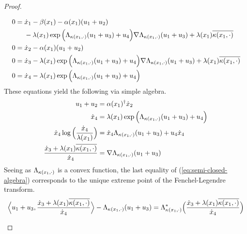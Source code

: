 \begin{proof}
\begin{enumerate}
\begin{align*}
        0 &= \begin{aligned}[t]
          &\dot{x}_1 - \beta(x_1) - \alpha(x_1) (u_1 + u_2) \\
          &- \lambda(x_1) \exp\Big( \Lambda_{\kappa(x_1,\cdot)}(u_1+u_3) + u_4\Big) \nabla\Lambda_{\kappa(x_1,\cdot)}(u_1+u_3) + \lambda(x_1) \overline{\kappa(x_1, \cdot)}
        \end{aligned} \\
        0 &= \dot{x}_2 - \alpha(x_1) ( u_1 + u_2 ) \\
        0 &= \dot{x}_3 - \lambda(x_1) \exp\Big( \Lambda_{\kappa(x_1,\cdot)}(u_1+u_3) + u_4\Big) \nabla\Lambda_{\kappa(x_1,\cdot)}(u_1+u_3) + \lambda(x_1) \overline{\kappa(x_1, \cdot)} \\
        0 &= \dot{x}_4 - \lambda(x_1) \exp\Big( \Lambda_{\kappa(x_1,\cdot)}(u_1+u_3) + u_4\Big) 
      \end{align*}
      These equations yield the following via simple algebra.
      \begin{equation}
        \label{eq:semi-closed-algebra}
        \begin{aligned}
          u_1 + u_2 &= \alpha(x_1)^\dagger \dot{x}_2 \\
          \dot{x}_4 &= \lambda(x_1) \exp\Big( \Lambda_{\kappa(x_1,\cdot)}(u_1+u_3) + u_4\Big)  \\
          \dot{x}_4\log\Big(\frac{\dot{x}_4}{\lambda(x_1)}\Big) &=   \dot{x}_4\Lambda_{\kappa(x_1,\cdot)}(u_1+u_3) + u_4\dot{x}_4 \\
          \frac{\dot{x}_3 + \lambda(x_1)\overline{\kappa(x_1,\cdot)}}{\dot{x}_4} &= \nabla\Lambda_{\kappa(x_1,\cdot)}(u_1+u_3)
        \end{aligned}
      \end{equation}
      Seeing as $\Lambda_{\kappa(x_1,\cdot)}$ is a convex function, the last equality of (\ref{eq:semi-closed-algebra}) corresponds to the unique extreme point of the Fenchel-Legendre transform.
      \begin{equation*}
        \Bprj{\momentVar_1 + \momentVar_3}{\frac{\diffVar_3+\affInt(\stateVar_1)\overline{\affDist(\stateVar_1,\cdot)}}{\diffVar_4}} - \ode_{\affDist(\stateVar_1,\cdot)}(\momentVar_1+\momentVar_3) = \ode_{\affDist(\stateVar_1,\cdot)}^*\Big(\frac{\diffVar_3+\affInt(\stateVar_1)\overline{\affDist(\stateVar_1,\cdot)}}{\diffVar_4}\Big)

\end{equation*}
\end{enumerate}
\end{proof}

